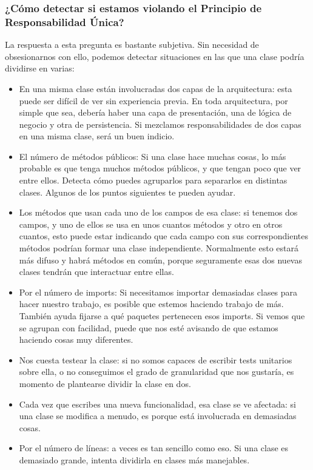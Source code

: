 \documentclass[12pt,letterpaper]{article}
\begin{document}
\subsubsection{¿Cómo detectar si estamos violando el Principio de Responsabilidad Única?}

La respuesta a esta pregunta es bastante subjetiva. Sin necesidad de obsesionarnos
con ello, podemos detectar situaciones en las que una clase podría dividirse en varias:



\begin{itemize}
\item En una misma clase están involucradas dos capas de la arquitectura: esta
puede ser difícil de ver sin experiencia previa. En toda arquitectura, por simple
que sea, debería haber una capa de presentación, una de lógica de negocio
y otra de persistencia. Si mezclamos responsabilidades de dos capas en una
misma clase, será un buen indicio.
\item El número de métodos públicos: Si una clase hace muchas cosas, lo más
probable es que tenga muchos métodos públicos, y que tengan poco que ver
entre ellos. Detecta cómo puedes agruparlos para separarlos en distintas clases.
Algunos de los puntos siguientes te pueden ayudar.
\item Los métodos que usan cada uno de los campos de esa clase: si tenemos
dos campos, y uno de ellos se usa en unos cuantos métodos y otro en otros
cuantos, esto puede estar indicando que cada campo con sus correspondientes
métodos podrían formar una clase independiente. Normalmente esto estará
más difuso y habrá métodos en común, porque seguramente esas dos nuevas
clases tendrán que interactuar entre ellas.
\item Por el número de imports: Si necesitamos importar demasiadas clases para
hacer nuestro trabajo, es posible que estemos haciendo trabajo de más. También ayuda fijarse a qué paquetes pertenecen esos imports. Si vemos que se
agrupan con facilidad, puede que nos esté avisando de que estamos haciendo
cosas muy diferentes.
\item Nos cuesta testear la clase: si no somos capaces de escribir tests unitarios
sobre ella, o no conseguimos el grado de granularidad que nos gustaría, es
momento de plantearse dividir la clase en dos.
\item Cada vez que escribes una nueva funcionalidad, esa clase se ve afectada:
si una clase se modifica a menudo, es porque está involucrada en demasiadas
cosas.
\item Por el número de líneas: a veces es tan sencillo como eso. Si una clase es
demasiado grande, intenta dividirla en clases más manejables.
    
\end{itemize} 
\end{document}

